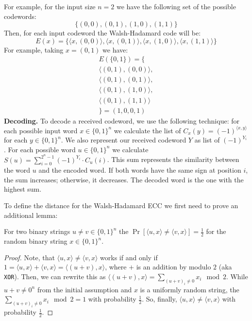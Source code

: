 \documentclass[../lecture-notes.tex]{subfiles}
\begin{document}
\begin{example}
For example, for the input size $n = 2$ we have the following set of the possible codewords:
\begin{equation*}
    \{(0, 0), (0, 1), (1, 0), (1, 1)\}
\end{equation*}
Then, for each input codeword the Walsh-Hadamard code will be:
\begin{equation*}
    E(x) = \{\langle x, (0, 0) \rangle, \langle x, (0, 1) \rangle, \langle x, (1, 0) \rangle, \langle x,  (1, 1) \rangle\}
\end{equation*}
For example, taking $x = (0, 1)$ we have:
\begin{gather*}
    E(\{0, 1\}) = \{\\
    \langle (0, 1), (0, 0) \rangle,\\
    \langle (0, 1), (0, 1) \rangle,\\
    \langle (0, 1), (1, 0) \rangle,\\
    \langle (0, 1), (1, 1) \rangle\\
    \}=(1, 0, 0, 1)
\end{gather*}
\textbf{Decoding.} To decode a received codeword, we use the following technique: for each possible input word 
$x \in \{0, 1\}^n$ we calculate the list of $C_x(y) = (-1)^{\langle x, y \rangle}$ for each $y \in \{0, 1\}^n$. We 
also represent our received codeword $Y$ as list of $(-1)^{Y_i}$. For each possible word $u \in \{0, 1\}^n$ we 
calculate $S(u) = \sum_{i=0}^{2^n - 1} (-1)^{Y_i} \cdot C_u(i)$. This sum represents the similarity between the word 
$u$ and the encoded word. If both words have the same sign at position  $i$, the sum increases; otherwise, it 
decreases. The decoded word is the one with the highest sum.
\end{example}
To define the distance for the Walsh-Hadamard ECC we first need to prove an additional lemma:
\begin{lemma}
For two binary strings $u \neq v \in \{0, 1\}^n$ the $\Pr[\langle u, x \rangle \neq \langle v, x \rangle] = \frac{1}{2}$
 for the random binary string $x \in \{0, 1\}^n$.
\end{lemma}
\begin{proof}
Note, that $\langle u, x \rangle \neq \langle v, x \rangle$ works if and only if 
$1 = \langle u, x \rangle + \langle v, x \rangle = \langle (u + v), x \rangle$, where $+$ is an addition by modulo 
$2$ (aka \verb|XOR|). Then, we can rewrite this as $\langle (u + v), x \rangle = \sum_{(u + v)_i \neq 0} x_i \mod 2$. 
While $u + v \neq 0^n$ from the initial assumption and $x$ is a uniformly random string, the 
$\sum_{(u + v)_i \neq 0} x_i \mod 2 = 1$ with probability $\frac{1}{2}$. So, finally, 
$\langle u, x \rangle \neq \langle v, x \rangle$ with probability $\frac{1}{2}$.
\end{proof}
\end{document}
